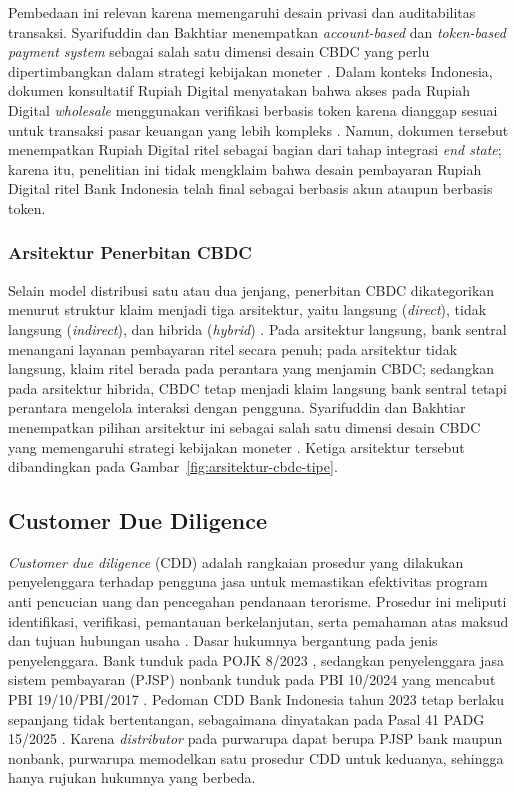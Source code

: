 Pembedaan ini relevan karena memengaruhi desain privasi dan auditabilitas
transaksi. Syarifuddin dan Bakhtiar menempatkan
\textit{account-based} dan \textit{token-based payment system} sebagai salah
satu dimensi desain CBDC yang perlu dipertimbangkan dalam strategi kebijakan
moneter \cite{SyarifuddinBakhtiar2021Monetary}. Dalam konteks Indonesia,
dokumen konsultatif Rupiah Digital menyatakan bahwa akses pada
Rupiah Digital \textit{wholesale} menggunakan verifikasi berbasis token karena
dianggap sesuai untuk transaksi pasar keuangan yang lebih kompleks
\cite{bi_consultative}. Namun, dokumen tersebut menempatkan Rupiah Digital
ritel sebagai bagian dari tahap integrasi \textit{end state}; karena itu,
penelitian ini tidak mengklaim bahwa desain pembayaran Rupiah Digital ritel
Bank Indonesia telah final sebagai berbasis akun ataupun berbasis token.

\subsubsection{Arsitektur Penerbitan CBDC}

Selain model distribusi satu atau dua jenjang, penerbitan CBDC dikategorikan
menurut struktur klaim menjadi tiga arsitektur, yaitu langsung
(\textit{direct}), tidak langsung (\textit{indirect}), dan hibrida
(\textit{hybrid}) \cite{Auer2020The}. Pada arsitektur langsung, bank sentral
menangani layanan pembayaran ritel secara penuh; pada arsitektur tidak langsung,
klaim ritel berada pada perantara yang menjamin CBDC; sedangkan pada arsitektur
hibrida, CBDC tetap menjadi klaim langsung bank sentral tetapi perantara
mengelola interaksi dengan pengguna. Syarifuddin dan Bakhtiar menempatkan pilihan
arsitektur ini sebagai salah satu dimensi desain CBDC yang memengaruhi strategi
kebijakan moneter \cite{SyarifuddinBakhtiar2021Monetary}. Ketiga arsitektur
tersebut dibandingkan pada Gambar~\ref{fig:arsitektur-cbdc-tipe}.



\subsection{Customer Due Diligence}

\textit{Customer due diligence} (CDD) adalah rangkaian prosedur yang dilakukan penyelenggara terhadap pengguna jasa untuk memastikan efektivitas program anti pencucian uang dan pencegahan pendanaan terorisme. Prosedur ini meliputi identifikasi, verifikasi, pemantauan berkelanjutan, serta pemahaman atas maksud dan tujuan hubungan usaha \cite[hlm.~6]{bi2023pedoman}. Dasar hukumnya bergantung pada jenis penyelenggara. Bank tunduk pada POJK 8/2023 \cite{ojk2023pojk8}, sedangkan penyelenggara jasa sistem pembayaran (PJSP) nonbank tunduk pada PBI 10/2024 yang mencabut PBI 19/10/PBI/2017 \cite{bi2024pbi10}. Pedoman CDD Bank Indonesia tahun 2023 tetap berlaku sepanjang tidak bertentangan, sebagaimana dinyatakan pada Pasal 41 PADG 15/2025 \cite{bi2025padg15}. Karena \textit{distributor} pada purwarupa dapat berupa PJSP bank maupun nonbank, purwarupa memodelkan satu prosedur CDD untuk keduanya, sehingga hanya rujukan hukumnya yang berbeda.

